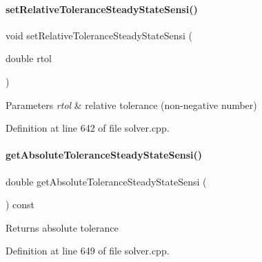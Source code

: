 \paragraph{\texorpdfstring{set\+Relative\+Tolerance\+Steady\+State\+Sensi()}{setRelativeToleranceSteadyStateSensi()}}
{\footnotesize\ttfamily void set\+Relative\+Tolerance\+Steady\+State\+Sensi (\begin{DoxyParamCaption}\item[{double}]{rtol }\end{DoxyParamCaption})}


\begin{DoxyParams}{Parameters}
{\em rtol} & relative tolerance (non-\/negative number) \\
\hline
\end{DoxyParams}


Definition at line 642 of file solver.\+cpp.

\mbox{\label{classamici_1_1_solver_ae1b148791e34ba2220eba9c75d21afb0}} 
\paragraph{\texorpdfstring{get\+Absolute\+Tolerance\+Steady\+State\+Sensi()}{getAbsoluteToleranceSteadyStateSensi()}}
{\footnotesize\ttfamily double get\+Absolute\+Tolerance\+Steady\+State\+Sensi (\begin{DoxyParamCaption}{ }\end{DoxyParamCaption}) const}

\begin{DoxyReturn}{Returns}
absolute tolerance 
\end{DoxyReturn}


Definition at line 649 of file solver.\+cpp.

